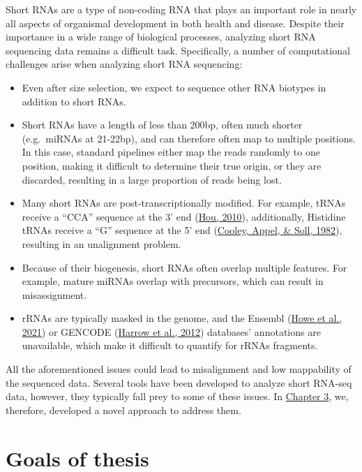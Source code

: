 \documentclass[12pt,twoside]{reedthesis}
\begin{document}
Short RNAs are a type of non-coding RNA that plays an important role in
nearly all aspects of organismal development in both health and disease.
Despite their importance in a wide range of biological processes,
analyzing short RNA sequencing data remains a difficult task.
Specifically, a number of computational challenges arise when analyzing
short RNA sequencing:
\begin{itemize}
\item
  Even after size selection, we expect to sequence other RNA biotypes
  in addition to short RNAs.
\item
  Short RNAs have a length of less than 200bp, often much shorter
  (e.g.~miRNAs at 21-22bp), and can therefore often map to multiple
  positions. In this case, standard pipelines either map the reads
  randomly to one position, making it difficult to determine their
  true origin, or they are discarded, resulting in a large proportion
  of reads being lost.
\item
  Many short RNAs are post-transcriptionally modified. For example,
  tRNAs receive a ``CCA'' sequence at the 3' end (\protect\hyperlink{ref-hou2010}{Hou, 2010}),
  additionally, Histidine tRNAs receive a ``G'' sequence at the 5' end
  (\protect\hyperlink{ref-cooley1982}{Cooley, Appel, \& Soll, 1982}), resulting in an unalignment problem.
\item
  Because of their biogenesis, short RNAs often overlap multiple
  features. For example, mature miRNAs overlap with precursors, which
  can result in misassignment.
\item
  rRNAs are typically masked in the genome, and the Ensembl
  (\protect\hyperlink{ref-howe2021}{Howe et al., 2021}) or GENCODE (\protect\hyperlink{ref-harrow2012}{Harrow et al., 2012}) databases' annotations are
  unavailable, which make it difficult to quantify for rRNAs
  fragments.
\end{itemize}
All the aforementioned issues could lead to misalignment and low
mappability of the sequenced data. Several tools have been developed to
analyze short RNA-seq data, however, they typically fall prey to some of
these issues. In \protect\hyperlink{chapter3}{Chapter 3}, we, therefore, developed a novel approach to
address them.

\hypertarget{goals-of-thesis}{%
\section*{Goals of thesis}\label{goals-of-thesis}}
\end{document}
